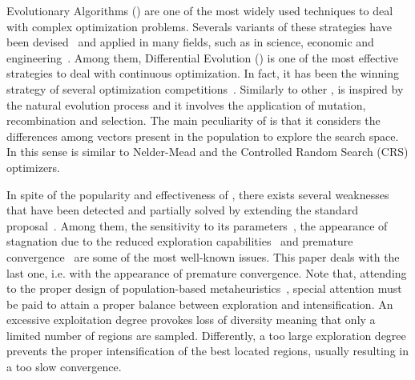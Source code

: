 Evolutionary Algorithms (\EAS{}) are one of the most widely used techniques to deal with complex optimization problems.
%
Severals variants of these strategies have been devised~\cite{Talbi:09} and applied in many fields, such as in science, 
economic and engineering~\cite{chakraborty2008advances}.
%
Among them, Differential Evolution (\DE{}) \cite{storn1997differential} is one of the most effective strategies to deal
with continuous optimization.
%
In fact, it has been the winning strategy of several optimization competitions~\cite{das2011differential}.
%
Similarly to other \EAS{}, \DE{} is inspired by the natural evolution process and it involves the application of mutation, recombination and 
selection.
%
The main peculiarity of \DE{} is that it considers the differences among vectors present in the population to explore the search space.
%
In this sense is similar to Nelder-Mead \cite{nelder1965simplex} and the 
Controlled Random Search (CRS) \cite{price1983global} optimizers.

In spite of the popularity and effectiveness of \DE{}, there exists several weaknesses that have been detected and partially
solved by extending the standard proposal~\cite{das2011differential}.
%
Among them, the sensitivity to its parameters~\cite{gamperle2002parameter, zhang2009jade}, the appearance of stagnation due to the reduced exploration 
capabilities~\cite{sa2008exploration,lampinen2000stagnation} and premature convergence~\cite{zaharie2003control} are some of the most well-known
issues.
%
This paper deals with the last one, i.e. with the appearance of premature convergence.
%
Note that, attending to the proper design of population-based metaheuristics~\cite{Talbi:09}, special attention must be
paid to attain a proper balance between exploration and intensification.
%
An excessive exploitation degree provokes loss of diversity meaning that only a limited number of regions are sampled.
%
Differently, a too large exploration degree prevents the proper intensification of the best located regions, usually resulting in a
too slow convergence.

